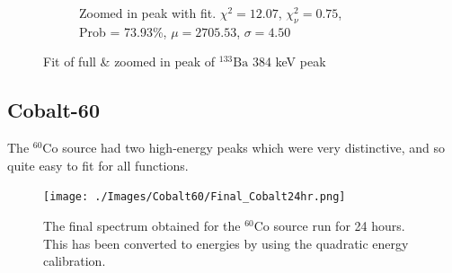 \documentclass[11pt,a4paper]{article}
\newcommand{\element}[2]{$^{#2}\textrm{#1}$}
\begin{document}
\begin{figure}[H]
\begin{subfigure}{.5\linewidth}
    \caption{Zoomed in peak with fit. $\chi^2 = 12.07$, $\chi^2_\nu = 0.75$, \\ Prob = 73.93\%, $\mu = 2705.53$, $\sigma = 4.50$}
  \end{subfigure}
  \caption{Fit of full \& zoomed in peak of \element{Ba}{133} 384 keV peak}
\end{figure}
\clearpage

\subsection{Cobalt-60}
The \element{Co}{60} source had two high-energy peaks which were very distinctive, and so quite easy to fit for all functions.
\begin{figure}[H]
  \centering
  \texttt{[image: ./Images/Cobalt60/Final\_Cobalt24hr.png]}
  \caption{The final spectrum obtained for the \element{Co}{60} source run for 24 hours. This has been converted to energies by using the quadratic energy calibration.}
\end{figure} 
\end{document}
